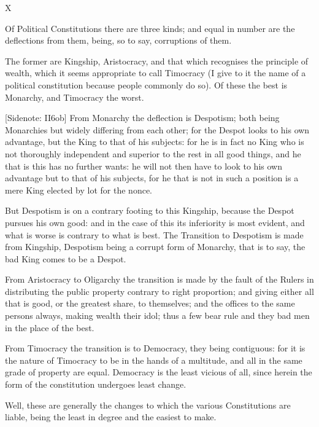 X

Of Political Constitutions there are three kinds; and equal in number
are the deflections from them, being, so to say, corruptions of them.

The former are Kingship, Aristocracy, and that which recognises the
principle of wealth, which it seems appropriate to call Timocracy (I
give to it the name of a political constitution because people commonly
do so). Of these the best is Monarchy, and Timocracy the worst.

[Sidenote: II6ob] From Monarchy the deflection is Despotism; both being
Monarchies but widely differing from each other; for the Despot looks to
his own advantage, but the King to that of his subjects: for he is in
fact no King who is not thoroughly independent and superior to the rest
in all good things, and he that is this has no further wants: he will
not then have to look to his own advantage but to that of his subjects,
for he that is not in such a position is a mere King elected by lot for
the nonce.

But Despotism is on a contrary footing to this Kingship, because the
Despot pursues his own good: and in the case of this its inferiority
is most evident, and what is worse is contrary to what is best. The
Transition to Despotism is made from Kingship, Despotism being a corrupt
form of Monarchy, that is to say, the bad King comes to be a Despot.

From Aristocracy to Oligarchy the transition is made by the fault of the
Rulers in distributing the public property contrary to right proportion;
and giving either all that is good, or the greatest share, to
themselves; and the offices to the same persons always, making wealth
their idol; thus a few bear rule and they bad men in the place of the
best.

From Timocracy the transition is to Democracy, they being contiguous:
for it is the nature of Timocracy to be in the hands of a multitude,
and all in the same grade of property are equal. Democracy is the least
vicious of all, since herein the form of the constitution undergoes
least change.

Well, these are generally the changes to which the various Constitutions
are liable, being the least in degree and the easiest to make.

